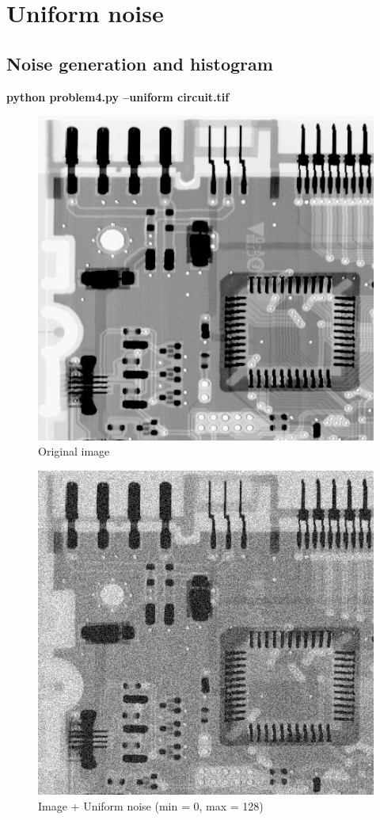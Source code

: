 \pagebreak
\section{Uniform noise}

\subsection{Noise generation and histogram}

\textbf{python problem4.py --uniform circuit.tif}

\begin{figure}[!htb]\centering
    \includegraphics[width=0.6\linewidth]{./images/4/original.jpg}
    \caption{\small{Original image}}
\end{figure}

\begin{figure}[!htb]\centering
    \includegraphics[width=0.6\linewidth]{./images/4/uniform_noise.jpg}
    \caption{\small{Image + Uniform noise (min = 0, max = 128)}}\label{diagram:uniform_noise}
\end{figure}


